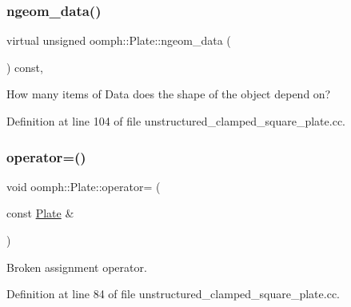 \mbox{\label{classoomph_1_1Plate_a495af9d0abd0af9a9f25ac3bfa4820e4}} 
\subsubsection{\texorpdfstring{ngeom\+\_\+data()}{ngeom\_data()}}
{\footnotesize\ttfamily virtual unsigned oomph\+::\+Plate\+::ngeom\+\_\+data (\begin{DoxyParamCaption}{ }\end{DoxyParamCaption}) const\hspace{0.3cm}{\ttfamily [inline]}, {\ttfamily [virtual]}}



How many items of Data does the shape of the object depend on? 



Definition at line 104 of file unstructured\+\_\+clamped\+\_\+square\+\_\+plate.\+cc.

\mbox{\label{classoomph_1_1Plate_aaa31862fcb1a579c95035cfeca7f8e7e}} 
\subsubsection{\texorpdfstring{operator=()}{operator=()}}
{\footnotesize\ttfamily void oomph\+::\+Plate\+::operator= (\begin{DoxyParamCaption}\item[{const \hyperlink{classoomph_1_1Plate}{Plate} \&}]{ }\end{DoxyParamCaption})\hspace{0.3cm}{\ttfamily [inline]}}



Broken assignment operator. 



Definition at line 84 of file unstructured\+\_\+clamped\+\_\+square\+\_\+plate.\+cc.

\mbox{\label{classoomph_1_1Plate_ad443e4bfc90da07a5d32083d341586dc}} 

